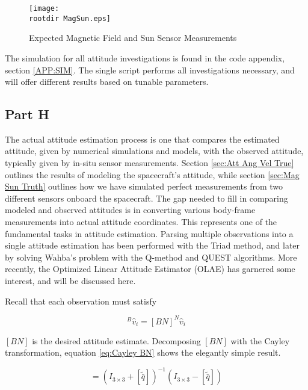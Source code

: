 \documentclass[11pt]{aiaa-tc}%
\newcommand{\rootdir}{./Figures/}
\begin{document}
\begin{centering}
	\begin{figure}[Hh]
		\texttt{[image: \\rootdir MagSun.eps]}
		\caption{Expected Magnetic Field and Sun Sensor Measurements}
		\label{fig:Mag Sun True}
	\end{figure}
\end{centering}

The simulation for all attitude investigations is found in the code appendix, section \ref{APP:SIM}. The single script performs all investigations necessary, and will offer different results based on tunable parameters. 

\subsection{Part H}
\label{sec:OLAE Truth}
The actual attitude estimation process is one that compares the estimated attitude, given by numerical simulations and models, with the observed attitude, typically given by in-situ sensor measurements. Section \ref{sec:Att Ang Vel True} outlines the results of modeling the spacecraft's attitude, while section \ref{sec:Mag Sun Truth} outlines how we have simulated perfect measurements from two different sensors onboard the spacecraft. The gap needed to fill in comparing modeled and observed attitudes is in converting various body-frame measurements into actual attitude coordinates. This represents one of the fundamental tasks in attitude estimation. Parsing multiple observations into a single attitude estimation has been performed with the Triad method, and later by solving Wahba's problem with the Q-method and QUEST algorithms. More recently, the Optimized Linear Attitude Estimator (OLAE) has garnered some interest, and will be discussed here. 

Recall that each observation must satisfy

\begin{equation}
		^B\hat{v}_i =[BN] ^N\hat{v}_i	
		\label{eq:Linear Attitude}
\end{equation}

$[BN]$ is the desired attitude estimate. Decomposing $[BN]$ with the Cayley transformation, equation \ref{eq:Cayley BN} shows the elegantly simple result. 


\begin{equation}
		[BN] = (I_{3 \times 3} + [\tilde{\bar{q}}] )^{-1} ( I_{3 \times 3} - [\tilde{\bar{q}}]  ) 
		\label{eq:Cayley BN}
\end{equation}
\end{document}

